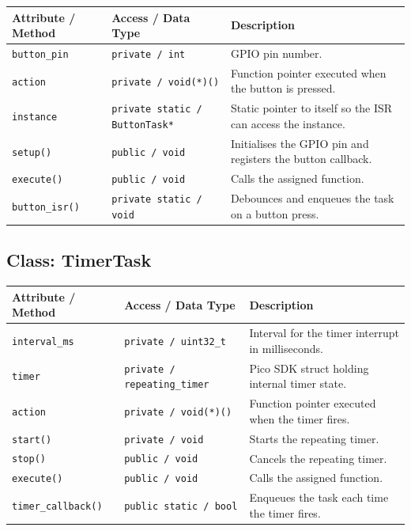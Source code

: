 \documentclass[12pt]{article}
\begin{document}
\begin{longtable}{P{3.5cm} P{3.8cm} P{6.7cm}}
\toprule
\textbf{Attribute / Method} & \textbf{Access / Data Type} & \textbf{Description} \\
\midrule
\endhead

\texttt{button\_pin}  & \texttt{private / int}                & GPIO pin number. \\
\texttt{action}       & \texttt{private / void(*)()} & Function pointer executed when the button is pressed. \\
\texttt{instance}     & \texttt{private static / ButtonTask*} & Static pointer to itself so the ISR can access the instance. \\
\texttt{setup()}      & \texttt{public / void}                & Initialises the GPIO pin and registers the button callback. \\
\texttt{execute()}    & \texttt{public / void}                & Calls the assigned function. \\
\texttt{button\_isr()} & \texttt{private static / void}       & Debounces and enqueues the task on a button press. \\
\bottomrule
\end{longtable}

\subsection*{Class: TimerTask}

\begin{longtable}{P{3.5cm} P{3.8cm} P{6.7cm}}
\toprule
\textbf{Attribute / Method} & \textbf{Access / Data Type} & \textbf{Description} \\
\midrule
\endhead

\texttt{interval\_ms}      & \texttt{private / uint32\_t}         & Interval for the timer interrupt in milliseconds. \\
\texttt{timer}             & \texttt{private / repeating\_timer}  & Pico SDK struct holding internal timer state. \\
\texttt{action}            & \texttt{private / void(*)()} & Function pointer executed when the timer fires. \\
\texttt{start()}           & \texttt{private / void}              & Starts the repeating timer. \\
\texttt{stop()}            & \texttt{public / void}               & Cancels the repeating timer. \\
\texttt{execute()}         & \texttt{public / void}               & Calls the assigned function. \\
\texttt{timer\_callback()} & \texttt{public static / bool}        & Enqueues the task each time the timer fires. \\
\bottomrule
\end{longtable}
\end{document}
